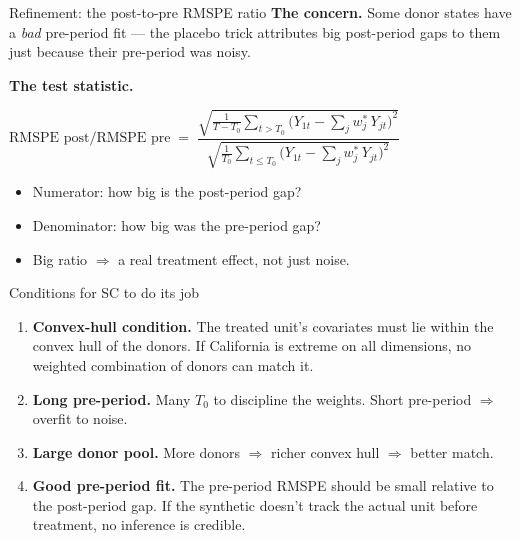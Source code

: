 \documentclass[aspectratio=169,11pt]{beamer}
\begin{document}
\begin{frame}{Refinement: the post-to-pre RMSPE ratio}
\vspace{0.5em}
\textbf{The concern.} \;Some donor states have a \textit{bad} pre-period fit --- the placebo trick attributes big post-period gaps to them just because their pre-period was noisy.

\vspace{0.5em}
\textbf{The test statistic.} \;
\begin{center}\small
$\text{RMSPE post}/\text{RMSPE pre} \;=\; \dfrac{\sqrt{\frac{1}{T - T_0}\sum_{t > T_0}\big(Y_{1t} - \sum_j w_j^{*}\, Y_{jt}\big)^2}}{\sqrt{\frac{1}{T_0}\sum_{t \leq T_0}\big(Y_{1t} - \sum_j w_j^{*}\, Y_{jt}\big)^2}}$
\end{center}

\vspace{0.5em}
\begin{itemize}\small
  \item Numerator: how big is the post-period gap?
  \item Denominator: how big was the pre-period gap?
  \item Big ratio $\Rightarrow$ a real treatment effect, not just noise.
\end{itemize}

\vspace{0.4em}
\end{frame}


\begin{frame}{Conditions for SC to do its job}
\vspace{0.5em}
\begin{enumerate}
  \item \textbf{Convex-hull condition.} \;The treated unit's covariates must lie within the convex hull of the donors. \;If California is extreme on all dimensions, no weighted combination of donors can match it.
  \vspace{0.3em}
  \item \textbf{Long pre-period.} \;Many $T_0$ to discipline the weights. \;Short pre-period $\Rightarrow$ overfit to noise.
  \vspace{0.3em}
  \item \textbf{Large donor pool.} \;More donors $\Rightarrow$ richer convex hull $\Rightarrow$ better match.
  \vspace{0.3em}
  \item \textbf{Good pre-period fit.} \;The pre-period RMSPE should be small relative to the post-period gap. \;If the synthetic doesn't track the actual unit before treatment, no inference is credible.
\end{enumerate}
\end{frame}
\end{document}
